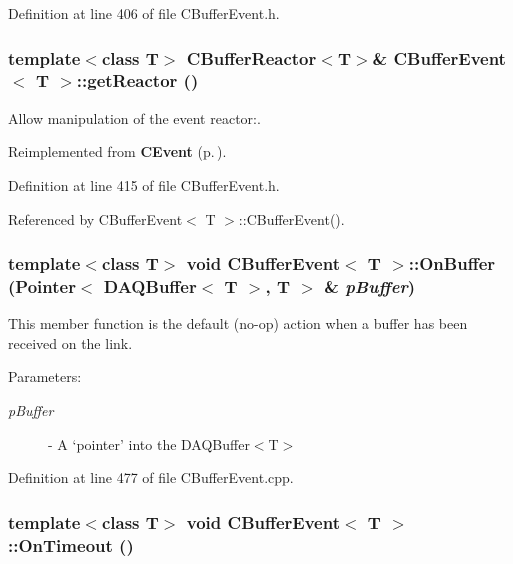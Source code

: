 Definition at line 406 of file CBuffer\-Event.h.
\subsubsection{\setlength{\rightskip}{0pt plus 5cm}template$<$class T$>$ {\bf CBuffer\-Reactor}$<$T$>$\& CBuffer\-Event$<$ T $>$::get\-Reactor ()\hspace{0.3cm}{\tt  [inline]}}\label{classCBufferEvent_a7}


Allow manipulation of the event reactor:.



Reimplemented from {\bf CEvent} {\rm (p.\,\pageref{classCEvent_a9})}.

Definition at line 415 of file CBuffer\-Event.h.

Referenced by CBuffer\-Event$<$ T $>$::CBuffer\-Event().
\subsubsection{\setlength{\rightskip}{0pt plus 5cm}template$<$class T$>$ void CBuffer\-Event$<$ T $>$::On\-Buffer (Pointer$<$ DAQBuffer$<$ T $>$, T $>$ \& {\em p\-Buffer})\hspace{0.3cm}{\tt  [virtual]}}\label{classCBufferEvent_a10}


This member function is the default (no-op) action when a buffer has been received on the link.\begin{Desc}
\item[Parameters: ]\par
\begin{description}
\item[{\em 
p\-Buffer}]- A `pointer' into the DAQBuffer$<$T$>$ \end{description}
\end{Desc}


Definition at line 477 of file CBuffer\-Event.cpp.
\subsubsection{\setlength{\rightskip}{0pt plus 5cm}template$<$class T$>$ void CBuffer\-Event$<$ T $>$::On\-Timeout ()\hspace{0.3cm}{\tt  [virtual]}}\label{classCBufferEvent_a11}



